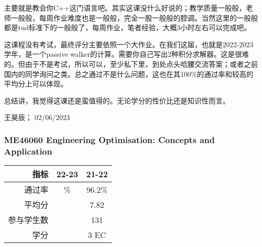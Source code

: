 主要就是教会你C++这门语言吧。其实这课没什么好说的；教学质量一般般，老师一般般，每周作业难度也是一般般，完全一股一般般的腔调。当然这里的一般般都是tud标准下的一般般了，每周作业，笔者经验，大概3小时左右可以完成吧。

这课程没有考试，最终评分主要依照一个大作业。在我们这届，也就是2022-2023学年，是一个passive walker的计算。需要你自己写出2种积分求解器。这是很难的。但由于不是考试，所以可以，至少私下里，到处点头哈腰交流答案；或者之前国内的同学询问之类。总之通过不是什么问题，这也在其100\%的通过率和较高的平均分上可以体现。

总结讲，我觉得这课还是蛮值得的。无论学分的性价比还是知识性而言。
\begin{flushright}
王昊辰； 02/06/2023
\end{flushright}


\subsubsection[ME46060 Engineering Optimisation: Concepts and Application]{ME46060 Engineering Optimisation: Concepts and Application}
\begin{minipage}{0.45\textwidth}
\raggedleft
\begin{tabular}{r|c|c}
\textbf{指标} & \textbf{22-23}& \textbf{21-22} \\ \hline
通过率 &\% & 96.2\% \\ 
平均分 & & 7.82 \\ 
参与学生数&  & 131 \\
学分 & & 3 EC\\
\end{tabular}
\end{minipage}\\

